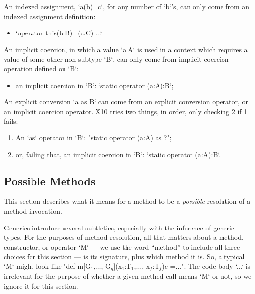 An indexed assignment, \xcd`a(b)=c`, for any number of \xcd`b`'s, can only
come from an indexed assignment definition: 
\begin{itemize}
\item \xcd`operator this(b:B)=(c:C) {...}`
\end{itemize}

An implicit coercion, in 
which a value \xcd`a:A` is used in a context which requires a value of some
other non-subtype \xcd`B`, 
can only come from implicit coercion operation defined on
\xcd`B`: 
\begin{itemize}
\item an implicit coercion in \xcd`B`:
      \xcd`static operator (a:A):B`;
\end{itemize}

An explicit conversion \xcd`a as B` can come from an explicit conversion
operator, or an implicit coercion operator.  X10 tries two things, in order,
only checking 2 if 1 fails: 
\begin{enumerate}
\item An \xcd`as` operator in \xcd`B`: 
      \xcdmath"static operator (a:A) as ?";

\item or, failing that, an implicit coercion in \xcd`B`:
      \xcd`static operator (a:A):B`.

\end{enumerate}



\subsection{Possible Methods}

This section describes what it means for a method to be a {\em possible}
resolution of a method invocation.  



Generics introduce several subtleties, especially with the inference of
generic types. 
For the purposes of method resolution, all that matters about a method,
constructor, or operator \xcd`M` --- we use the word ``method'' to include all
three choices for this section --- is its signature, plus which method it is.
So, a typical \xcd`M` might look like 
\xcdmath"def m[G$_1$,$\ldots$, G$_g$](x$_1$:T$_1$,$\ldots$, x$_f$:T$_f$){c} =...".  The code body \xcd`...` is irrelevant for the purpose of whether a
given method call means \xcd`M` or not, so we ignore it for this section.

